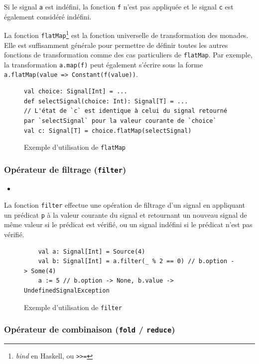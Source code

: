 Si le signal \texttt{a} est indéfini, la fonction \texttt{f} n'est pas appliquée et le signal \texttt{c} est également considéré indéfini.

La fonction \texttt{flatMap}\footnote{\emph{bind} en Haskell, ou \texttt{>>=}} est la fonction universelle de transformation des monades. Elle est suffisamment générale pour permettre de définir toutes les autres fonctions de transformation comme des cas particuliers de \texttt{flatMap}. Par exemple, la transformation \texttt{a.map(f)} peut également s'écrire  sous la forme \texttt{a.flatMap(value => Constant(f(value))}.

\begin{figure}[h]
	\begin{lstlisting}
val choice: Signal[Int] = ...
def selectSignal(choice: Int): Signal[T] = ...
// L'état de `c` est identique à celui du signal retourné par `selectSignal` pour la valeur courante de `choice`
val c: Signal[T] = choice.flatMap(selectSignal)
	\end{lstlisting}
	\caption{Exemple d'utilisation de \texttt{flatMap}}
\end{figure}

\subsubsection{Opérateur de filtrage (\texttt{filter})}

\begin{itemize}
	\item {}
\end{itemize}

La fonction \texttt{filter} effectue une opération de filtrage d'un signal en appliquant un prédicat \texttt{p} à la valeur courante du signal et retournant un nouveau signal de même valeur si le prédicat est vérifié, ou un signal indéfini si le prédicat n'est pas vérifié.

\begin{figure}[h]
	\begin{lstlisting}
	val a: Signal[Int] = Source(4)
	val b: Signal[Int] = a.filter(_ % 2 == 0) // b.option -> Some(4)
	a := 5 // b.option -> None, b.value -> UndefinedSignalException
	\end{lstlisting}
	\caption{Exemple d'utilisation de \texttt{filter}}
\end{figure}

\subsubsection{Opérateur de combinaison (\texttt{fold} / \texttt{reduce})} \label{sec:sig-op-fold}

